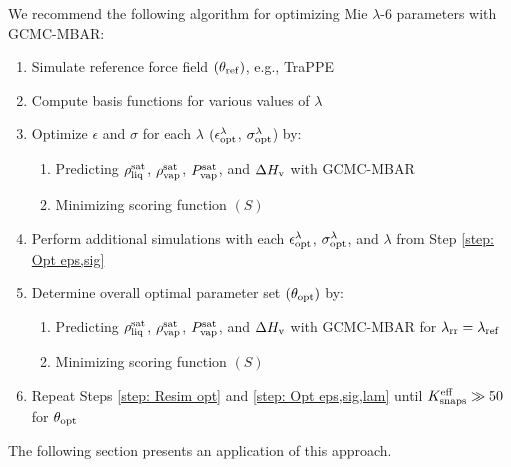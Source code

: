 \documentclass[journal=jced,manuscript=article]{achemso}
\begin{document}
We recommend the following algorithm for optimizing Mie $\lambda$-6 parameters with GCMC-MBAR:
\begin{enumerate}
	\item Simulate reference force field $(\theta_{\rm ref})$, e.g., TraPPE \label{step: Sim ref}
	\item Compute basis functions for various values of $\lambda$ \label{step: Basis Functions}
	\item Optimize $\epsilon$ and $\sigma$ for each $\lambda$ $(\epsilon_{\rm opt}^\lambda$, $\sigma_{\rm opt}^\lambda$) by: \label{step: Opt eps,sig}
	\begin{enumerate}
		\item Predicting $\rho_{\rm liq}^{\rm sat}$, $\rho_{\rm vap}^{\rm sat}$, $P_{\rm vap}^{\rm sat}$, and $\Delta H_{\rm v}$ with GCMC-MBAR
		\item Minimizing scoring function $(S)$
	\end{enumerate}
	\item Perform additional simulations with each $\epsilon_{\rm opt}^\lambda$, $\sigma_{\rm opt}^\lambda$, and $\lambda$ from Step \ref{step: Opt eps,sig} \label{step: Resim opt}
	\item Determine overall optimal parameter set $(\theta_{\rm opt})$ by: \label{step: Opt eps,sig,lam}
	\begin{enumerate}
		\item Predicting $\rho_{\rm liq}^{\rm sat}$, $\rho_{\rm vap}^{\rm sat}$, $P_{\rm vap}^{\rm sat}$, and $\Delta H_{\rm v}$ with GCMC-MBAR for $\lambda_{\rm rr} = \lambda_{\rm ref}$
		\item Minimizing scoring function $(S)$
	\end{enumerate}
	\item Repeat Steps \ref{step: Resim opt} and \ref{step: Opt eps,sig,lam} until $K_{\rm snaps}^{\rm eff} \gg 50$ for $\theta_{\rm opt}$ 
\end{enumerate}
The following section presents an application of this approach.


%
\end{document}
